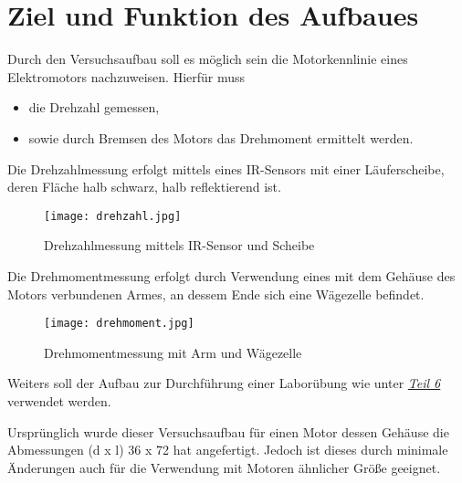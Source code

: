 \chapter{Ziel und Funktion des Aufbaues}

Durch den Versuchsaufbau soll es möglich sein die Motorkennlinie eines Elektromotors nachzuweisen.
Hierfür muss

\begin{itemize}
    \item die Drehzahl gemessen,
    \item sowie durch Bremsen des Motors das Drehmoment ermittelt werden.
\end{itemize}

Die Drehzahlmessung erfolgt mittels eines IR-Sensors mit einer Läuferscheibe, deren Fläche halb schwarz, halb reflektierend ist.

\begin{figure}[H]
    \begin{center}
        \texttt{[image: drehzahl.jpg]}
        \caption{Drehzahlmessung mittels IR-Sensor und Scheibe}
    \end{center}
\end{figure}

Die Drehmomentmessung erfolgt durch Verwendung eines mit dem Gehäuse des Motors verbundenen Armes, an dessem Ende sich eine Wägezelle befindet.

\begin{figure}[H]
    \begin{center}
        \texttt{[image: drehmoment.jpg]}
        \caption{Drehmomentmessung mit Arm und Wägezelle}
    \end{center}
\end{figure}

Weiters soll der Aufbau zur Durchführung einer Laborübung wie unter \hyperref[labuebung]{\textit{Teil 6}} verwendet werden.

Ursprünglich wurde dieser Versuchsaufbau für einen Motor dessen Gehäuse die Abmessungen (d x l) 36 x 72 hat angefertigt.
Jedoch ist dieses durch minimale Änderungen auch für die Verwendung mit Motoren ähnlicher Größe geeignet.
